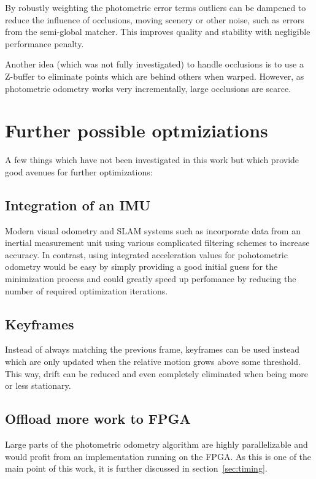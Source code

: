By robustly weighting the photometric error terms outliers can be dampened to
reduce the influence of occlusions, moving scenery or other noise, such as
errors from the semi-global matcher. This improves quality and stability with
negligible performance penalty.

Another idea (which was not fully investigated) to handle occlusions is to use a
Z-buffer to eliminate points which are behind others when warped. However, as
photometric odometry works very incrementally, large occlusions are scarce.

\section{Further possible optmiziations}

A few things which have not been investigated in this work but which provide
good avenues for further optimizations:

\subsection{Integration of an IMU}

Modern visual odometry and SLAM systems such as \cite{leutenegger2013keyframe}
incorporate data from an inertial measurement unit using various complicated
filtering schemes to increase accuracy.
In contrast, using integrated acceleration values for pohotometric odometry
would be easy by simply providing a good initial guess for the minimization
process and could greatly speed up perfomance by reducing the number of
required optimization iterations.

\subsection{Keyframes}

Instead of always matching the previous frame, keyframes can be used instead
which are only updated when the relative motion grows above some threshold.
This way, drift can be reduced and even completely eliminated when being more
or less stationary.

\subsection{Offload more work to FPGA}

Large parts of the photometric odometry algorithm are highly parallelizable and
would profit from an implementation running on the FPGA. As this is one of the
main point of this work, it is further discussed in section~\ref{sec:timing}.




